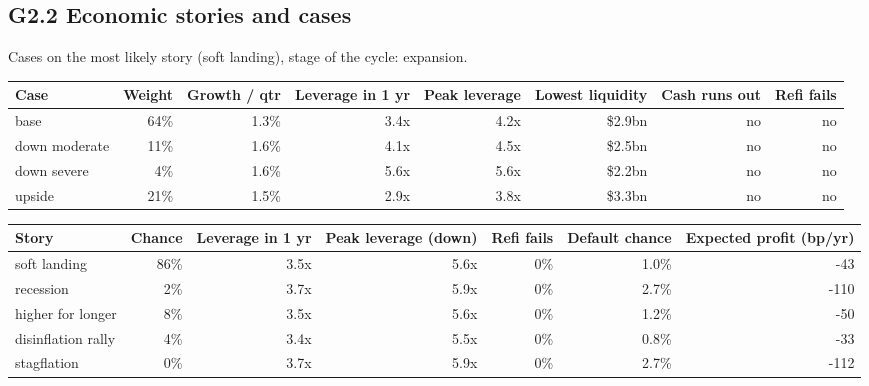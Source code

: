 \documentclass[11pt,a4paper]{article}
\begin{document}
\subsection*{G2.2 Economic stories and cases}
Cases on the most likely story (soft landing), stage of the cycle: expansion.
\begin{center}\scriptsize\setlength{\tabcolsep}{3.5pt}\begin{tabular}{@{}lrrrrrrr@{}}\toprule
Case & Weight & Growth / qtr & Leverage in 1 yr & Peak leverage & Lowest liquidity & Cash runs out & Refi fails \\\midrule
base & 64\% & 1.3\% & 3.4x & 4.2x & \$2.9bn & no & no \\
down moderate & 11\% & 1.6\% & 4.1x & 4.5x & \$2.5bn & no & no \\
down severe & 4\% & 1.6\% & 5.6x & 5.6x & \$2.2bn & no & no \\
upside & 21\% & 1.5\% & 2.9x & 3.8x & \$3.3bn & no & no \\
\bottomrule\end{tabular}\end{center}
\begin{center}\scriptsize\setlength{\tabcolsep}{3.5pt}\begin{tabular}{@{}lrrrrrr@{}}\toprule
Story & Chance & Leverage in 1 yr & Peak leverage (down) & Refi fails & Default chance & Expected profit (bp/yr) \\\midrule
soft landing & 86\% & 3.5x & 5.6x & 0\% & 1.0\% & -43 \\
recession & 2\% & 3.7x & 5.9x & 0\% & 2.7\% & -110 \\
higher for longer & 8\% & 3.5x & 5.6x & 0\% & 1.2\% & -50 \\
disinflation rally & 4\% & 3.4x & 5.5x & 0\% & 0.8\% & -33 \\
stagflation & 0\% & 3.7x & 5.9x & 0\% & 2.7\% & -112 \\
\bottomrule\end{tabular}\end{center}
\end{document}
